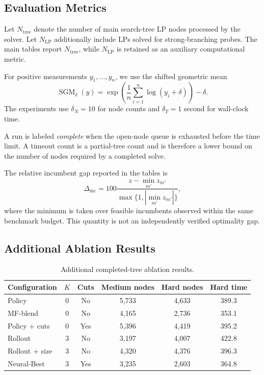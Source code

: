 \documentclass{article}
\begin{document}
\subsection{Evaluation Metrics}
\label{app:metrics}

Let $N_{\mathrm{tree}}$ denote the number of main search-tree LP nodes processed by the solver. Let $N_{\mathrm{LP}}$ additionally include LPs solved for strong-branching probes. The main tables report
$N_{\mathrm{tree}}$, while $N_{\mathrm{LP}}$ is retained as an auxiliary computational metric.

For positive measurements $y_1,\ldots,y_n$, we use the shifted geometric mean
\begin{equation}
\operatorname{SGM}_{\delta}(y)
=
\exp\left(
\frac{1}{n}
\sum_{i=1}^{n}
\log(y_i+\delta)
\right)-\delta.
\end{equation}
The experiments use $\delta_N=10$ for node counts and $\delta_T=1$ second
for wall-clock time.

A run is labeled \emph{complete} when the open-node queue is exhausted before the time limit. A timeout count is a partial-tree count and is therefore a lower bound on the number of nodes required by a completed solve.

The relative incumbent gap reported in the tables is
\begin{equation}
\Delta_{\mathrm{inc}}
=
100
\frac{z-\min_{m'}z_{m'}}
{\max\{1,|\min_{m'}z_{m'}|\}},
\end{equation}
where the minimum is taken over feasible incumbents observed within the same
benchmark budget. This quantity is not an independently verified optimality
gap.

\subsection{Additional Ablation Results}
\label{app:ablation}

\begin{table}[t]
\centering
\caption{Additional completed-tree ablation results.}
\label{tab:additional-ablation}
\begin{tabular}{lccccc}
\toprule
Configuration & $K$ & Cuts & Medium nodes & Hard nodes & Hard time \\
\midrule
Policy & 0 & No & 5,733 & 4,633 & 389.3 \\
MF-blend & 0 & No & 4,165 & 2,736 & 353.1 \\
Policy + cuts & 0 & Yes & 5,396 & 4,419 & 395.2 \\
Rollout & 3 & No & 3,197 & 4,007 & 422.8 \\
Rollout + size & 3 & No & 4,320 & 4,376 & 396.3 \\
Neural-Best & 3 & Yes & 3,235 & 2,603 & 364.8 \\
\bottomrule
\end{tabular}
\end{table}
\end{document}
